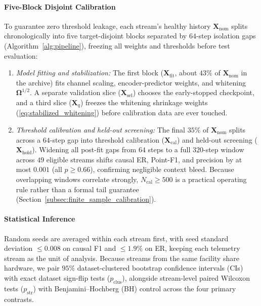 \documentclass[journal]{IEEEtran}
\begin{document}
\paragraph{Five-Block Disjoint Calibration}
To guarantee zero threshold leakage, each stream's healthy history $\mathbf{X}_{\text{nom}}$ splits chronologically into five target-disjoint blocks separated by $64$-step isolation gaps (Algorithm~\ref{alg:pipeline}), freezing all weights and thresholds before test evaluation:
\begin{enumerate}[leftmargin=*, nosep,Modelsep=1pt]
    \item \emph{Model fitting and stabilization:} The first block ($\mathbf{X}_{\text{fit}}$, about $43\%$ of $\mathbf{X}_{\text{nom}}$ in the archive) fits channel scaling, encoder-predictor weights, and whitening $\mathbf{\Omega}^{1/2}$. A separate validation slice ($\mathbf{X}_{\text{sel}}$) chooses the early-stopped checkpoint, and a third slice ($\mathbf{X}_q$) freezes the whitening shrinkage weights (\ref{eq:stabilized_whitening}) before calibration data are ever touched.
    \item \emph{Threshold calibration and held-out screening:} The final $35\%$ of $\mathbf{X}_{\text{nom}}$ splits across a $64$-step gap into threshold calibration ($\mathbf{X}_{\text{cal}}$) and held-out screening ($\mathbf{X}_{\text{hold}}$). Widening all post-fit gaps from $64$ steps to a full $320$-step window across $49$ eligible streams shifts causal ER, Point-F1, and precision by at most $0.001$ (all $p \ge 0.66$), confirming negligible context bleed. Because overlapping windows correlate strongly, $N_{\text{cal}} \ge 500$ is a practical operating rule rather than a formal tail guarantee (Section~\ref{subsec:finite_sample_calibration}).
\end{enumerate}

\paragraph{Statistical Inference}
Random seeds are averaged within each stream first, with seed standard deviation $\le 0.008$ on causal F1 and $\le 1.9\%$ on ER, keeping each telemetry stream as the unit of analysis. Because streams from the same facility share hardware, we pair $95\%$ dataset-clustered bootstrap confidence intervals (CIs) with exact dataset sign-flip tests ($p_{\text{clus}}$), alongside stream-level paired Wilcoxon tests ($p_{\text{str}}$) with Benjamini--Hochberg (BH) control \cite{benjamini1995controlling} across the four primary contrasts.
\end{document}
